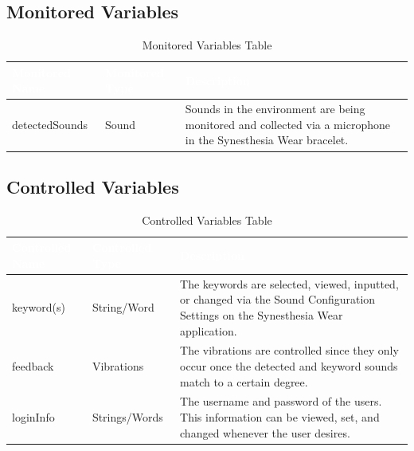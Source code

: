 \documentclass[12pt, titlepage]{article}
\begin{document}
\subsection{Monitored Variables}
\begin{table}[H]
  \centering
  \caption{Monitored Variables Table}
  \label{table:MonitoredVar Table} 
  \begin{tabular}{|p{5cm}|p{5cm}|p{5cm}|} 
  \hline
  \rowcolor[rgb]{0.071,0.49,0.698} \textcolor{white}{Monitored Name} & \textcolor{white}{Monitored Type} & \textcolor{white}{Description}                                          \\ 
  \hline
  \rowcolor[rgb]{0.675,0.827,0.902}   detectedSounds      & Sound &  Sounds in the environment are being monitored and collected via a microphone in the Synesthesia Wear bracelet. \\
  \hline
  \end{tabular}
\end{table}

\subsection{Controlled Variables}
\begin{table}[H]
  \centering
  \caption{Controlled Variables Table}
  \label{table:ControlledVar Table} 
  \begin{tabular}{|p{5cm}|p{5cm}|p{5cm}|} 
  \hline
  \rowcolor[rgb]{0.071,0.49,0.698} \textcolor{white}{Controlled Name} & \textcolor{white}{Controlled Type} & \textcolor{white}{Description}                                          \\ 
  \hline
  \rowcolor[rgb]{0.675,0.827,0.902}    keyword(s)     & String/Word &  The keywords are selected, viewed, inputted, or changed via the Sound Configuration Settings on the Synesthesia Wear application. \\
  \hline
  \rowcolor[rgb]{0.675,0.827,0.902}    feedback    &  Vibrations    &  The vibrations are controlled since they only occur once the detected and keyword sounds match to a certain degree.           \\
  \hline
  \rowcolor[rgb]{0.675,0.827,0.902}    loginInfo    &  Strings/Words    &  The username and password of the users. This information can be viewed, set, and changed whenever the user desires.           \\
  \hline
  \end{tabular}
\end{table}
\end{document}
